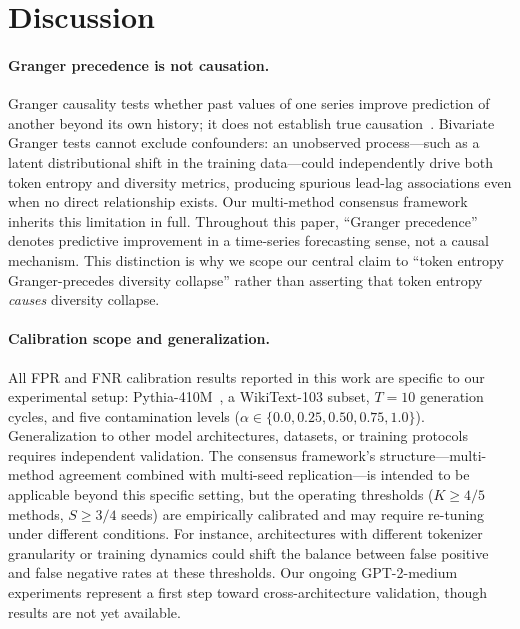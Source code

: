\section{Discussion}\label{sec:discussion}

\paragraph{Granger precedence is not causation.}
Granger causality tests whether past values of one series improve prediction of another beyond its own history; it does not establish true causation~\cite{granger1969investigating,shojaie2022granger}.
Bivariate Granger tests cannot exclude confounders: an unobserved process---such as a latent distributional shift in the training data---could independently drive both token entropy and diversity metrics, producing spurious lead-lag associations even when no direct relationship exists.
Our multi-method consensus framework inherits this limitation in full.
Throughout this paper, ``Granger precedence'' denotes predictive improvement in a time-series forecasting sense, not a causal mechanism.
This distinction is why we scope our central claim to ``token entropy Granger-precedes diversity collapse'' rather than asserting that token entropy \emph{causes} diversity collapse.

\paragraph{Calibration scope and generalization.}
All FPR and FNR calibration results reported in this work are specific to our experimental setup: Pythia-410M~\cite{biderman2023pythia}, a WikiText-103 subset, $T{=}10$ generation cycles, and five contamination levels ($\alpha \in \{0.0, 0.25, 0.50, 0.75, 1.0\}$).
Generalization to other model architectures, datasets, or training protocols requires independent validation.
The consensus framework's structure---multi-method agreement combined with multi-seed replication---is intended to be applicable beyond this specific setting, but the operating thresholds ($K{\geq}4/5$ methods, $S{\geq}3/4$ seeds) are empirically calibrated and may require re-tuning under different conditions.
For instance, architectures with different tokenizer granularity or training dynamics could shift the balance between false positive and false negative rates at these thresholds.
Our ongoing GPT-2-medium experiments represent a first step toward cross-architecture validation, though results are not yet available.

